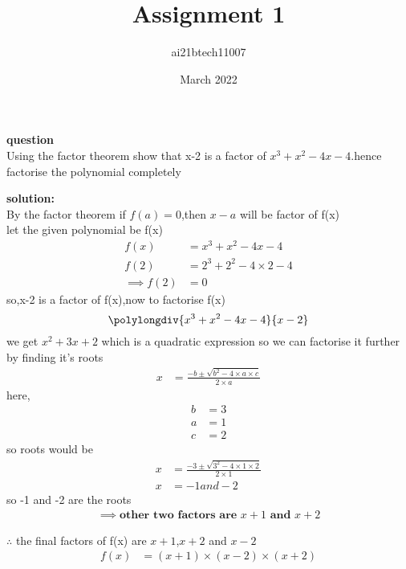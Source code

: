 \documentclass[12pt,two column]{article}
\title{Assignment 1}
\author{ai21btech11007 }
\date{March 2022}
\begin{document}
\maketitle

\textbf{question}\\
Using the factor theorem show that x-2 is a factor of $x^3+x^2-4x-4$.hence factorise the polynomial completely

\textbf{solution: }\\
By the factor theorem if $f(a)=0$,then $x-a$ will be factor of f(x)
\\let the given polynomial be f(x)
\begin{align}
  f(x) &= x^3+x^2-4x-4\\  
  f(2) &= 2^3+2^2-4\times2-4\\
\implies
f(2) &= 0
\end{align}
   so,x-2 is a factor of f(x),now to factorise f(x) 
\[
 \polylongdiv{x^3+x^2-4x-4}{x-2}
 \]
  we get $x^2+3x+2$
  which is a quadratic expression so we can factorise it further by finding it's roots
 \begin{align}
     x &= \frac{-b \pm \sqrt{b^2-4\times a\times c}}{2\times a}
 \end{align}
 here,
 \begin{align}
  b &=3\\
  a &=1\\
  c &=2
 \end{align}
 so roots would be
 \begin{align}
   x &= \frac{-3 \pm \sqrt{3^2-4\times 1\times 2}}{2\times 1} \\
   x &= -1 and -2
 \end{align}
 so -1 and -2 are the roots
\begin{align}
\implies
\textbf{other two factors are $x+1$ and $x+2$}
\end{align}

$\therefore$ the final factors of f(x) are $x+1$,$x+2$ and $x-2$
\begin{align}
f(x)&=( x+1)\times( x-2)\times( x+2)
\end{align}
\end{document}
